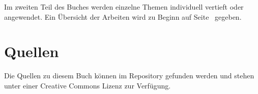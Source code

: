 


Im zweiten Teil des Buches werden einzelne Themen individuell
vertieft oder angewendet.
Ein Übersicht der Arbeiten wird zu Beginn auf Seite~\pageref{buch:uebersicht}
gegeben.

\section{Quellen}
Die Quellen zu diesem Buch können im Repository
\cite{buch:repo} gefunden werden und stehen unter einer Creative Commons
Lizenz zur Verfügung.


